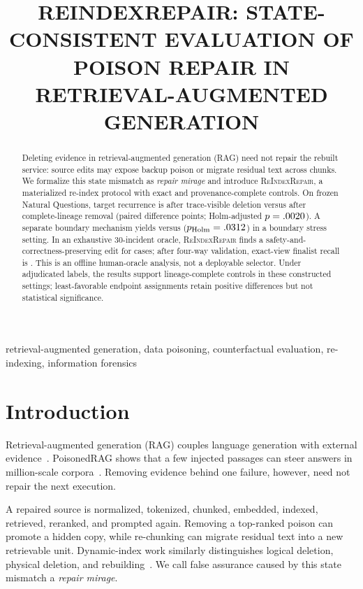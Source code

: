 \documentclass{article}
\title{REINDEXREPAIR: STATE-CONSISTENT EVALUATION OF POISON REPAIR IN RETRIEVAL-AUGMENTED GENERATION}
\newcommand{\method}{\textsc{ReIndexRepair}}
\begin{document}
\ninept %
\maketitle
\EvidenceBanner

\begin{abstract}
Deleting evidence in retrieval-augmented generation (RAG) need
not repair the rebuilt service: source edits may expose backup poison or migrate
residual text across chunks. We formalize this state mismatch as \emph{repair
mirage} and introduce \method{}, a materialized re-index protocol with exact
and provenance-complete controls. On frozen Natural Questions, target recurrence is \SubPartialCount{} after trace-visible
deletion versus \SubCompleteCount{} after complete-lineage removal (paired difference
\SubRiskDifference{} points; Holm-adjusted $p=.0020$). A separate boundary mechanism yields
\BoundaryPartialCount{} versus \BoundaryCompleteCount{} ($p_{\rm Holm}=.0312$) in a boundary stress setting. In an exhaustive
30-incident oracle, \method{} finds a safety-and-correctness-preserving edit for
\RepairFeasibleCount{} cases; after four-way validation, exact-view finalist recall is
\RepairFinalistCount{}. This is an offline human-oracle analysis,
not a deployable selector. Under adjudicated labels, the results support
lineage-complete controls in these constructed settings; least-favorable
endpoint assignments retain positive differences but not statistical significance.
\end{abstract}

\begin{keywords}
retrieval-augmented generation, data poisoning, counterfactual evaluation,
re-indexing, information forensics
\end{keywords}

\section{Introduction}
Retrieval-augmented generation (RAG) couples language generation with external
evidence~\cite{lewis2020rag,karpukhin2020dpr}. PoisonedRAG shows that a few
injected passages can steer answers in million-scale corpora~\cite{zou2025poisonedrag}.
Removing evidence behind one failure, however, need not repair the next execution.

A repaired source is normalized, tokenized, chunked, embedded, indexed,
retrieved, reranked, and prompted again. Removing a top-ranked poison can
promote a hidden copy, while re-chunking can migrate residual text into a new
retrievable unit. Dynamic-index work similarly distinguishes logical deletion,
physical deletion, and rebuilding~\cite{yamashita2025deletion}. We call false
assurance caused by this state mismatch a \emph{repair mirage}.
\end{document}
